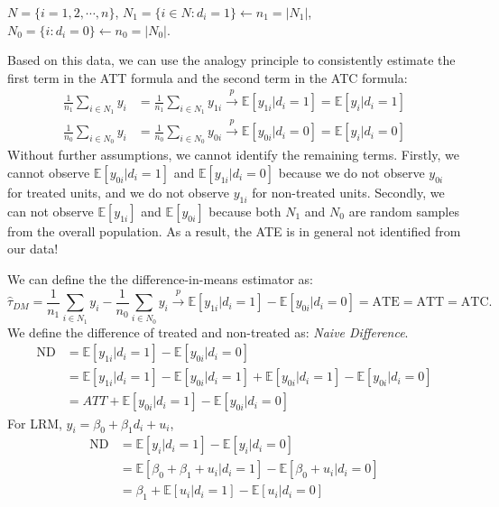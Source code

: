 $N = \{i=1,2,\cdots, n\}$, $N_1 = \{i \in N: d_i = 1\} \leftarrow n_1 = \vert N_1 \vert $, $N_0 = \{i: d_i = 0\} \leftarrow n_0 = \vert N_0 \vert $.

Based on this data, we can use the analogy principle to consistently estimate 
the first term in the ATT formula and the second term in the ATC formula:
\begin{align*}
  \frac{1}{n_1} \sum_{i \in N_1} y_i &= \frac{1}{n_1} \sum_{i \in N_1} y_{1i} \overset{p}{\rightarrow} \mathbb{E}[y_{1i} | d_i=1] = \mathbb{E}[y_i | d_i=1]\\
  \frac{1}{n_0} \sum_{i \in N_0} y_i &= \frac{1}{n_0} \sum_{i \in N_0} y_{0i} \overset{p}{\rightarrow} \mathbb{E}[y_{0i} | d_i=0] = \mathbb{E}[y_i | d_i=0]
\end{align*}
Without further assumptions, we cannot identify the remaining terms. Firstly, we cannot observe $\mathbb{E}[y_{0i} | d_i=1]$ and $\mathbb{E}[y_{1i} | d_i=0 ]$
because we do not observe $y_{0i}$ for treated units, and we do not observe $y_{1i}$ for non-treated units.
Secondly, we can not observe $\mathbb{E}[y_{1i}]$ and $\mathbb{E}[y_{0i}]$ because both $N_1$ and $N_0$ are random samples from the overall population.
As a result, the ATE is in general not identified from our data!

We can define the  the difference-in-means estimator as:
\[
\hat{\tau}_{DM} = \frac{1}{n_1} \sum_{i \in N_1} y_i - \frac{1}{n_0} \sum_{i \in N_0} y_i \overset{p}{\rightarrow} \mathbb{E}[y_{1i} | d_i = 1] - \mathbb{E}[y_{0i} | d_i = 0] = \text{ATE} = \text{ATT} = \text{ATC}.
\]
We define the difference of treated and non-treated as: \textit{Naive Difference}.
\begin{align*}
  \text{ND} &= \mathbb{E}[y_{1i} | d_i = 1] - \mathbb{E}[y_{0i} | d_i = 0]\\
  &= \mathbb{E}[y_{1i} | d_i = 1] - \mathbb{E}[y_{0i} | d_i = 1] + \mathbb{E}[y_{0i} | d_i =1] - \mathbb{E}[y_{0i} | d_i = 0] \\
  &= ATT + \mathbb{E}[y_{0i} | d_i = 1] - \mathbb{E}[y_{0i} | d_i = 0]
\end{align*}
For LRM, $y_i = \beta_0 + \beta_1 d_i + u_i$,
\begin{align*}
  \text{ND} &= \mathbb{E}[y_i | d_i = 1] - \mathbb{E}[y_i | d_i = 0]\\
  &= \mathbb{E}[\beta_0 + \beta_1 + u_i | d_i = 1] - \mathbb{E}[\beta_0 + u_i | d_i = 0]\\
  &= \beta_1 + \mathbb{E}[u_i | d_i = 1] - \mathbb{E}[u_i | d_i = 0]  
\end{align*}
